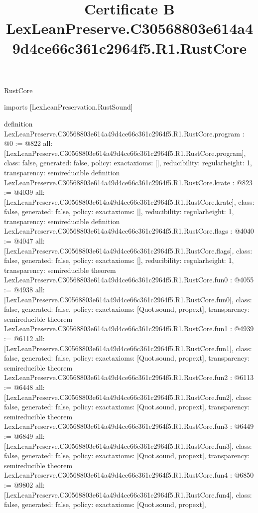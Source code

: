 \begin{lexlean}{RustCore}
\title{Certificate B LexLeanPreserve.C30568803e614a49d4ce66c361c2964f5.R1.RustCore}
\begin{coremodule}
imports [LexLeanPreservation.RustSound]

definition LexLeanPreserve.C30568803e614a49d4ce66c361c2964f5.R1.RustCore.program : @0 := @822 {
  all: [LexLeanPreserve.C30568803e614a49d4ce66c361c2964f5.R1.RustCore.program],
  class: false,
  generated: false,
  policy: exact{axioms: []},
  reducibility: regular{height: 1},
  transparency: semireducible
}
definition LexLeanPreserve.C30568803e614a49d4ce66c361c2964f5.R1.RustCore.krate : @823 := @4039 {
  all: [LexLeanPreserve.C30568803e614a49d4ce66c361c2964f5.R1.RustCore.krate],
  class: false,
  generated: false,
  policy: exact{axioms: []},
  reducibility: regular{height: 1},
  transparency: semireducible
}
definition LexLeanPreserve.C30568803e614a49d4ce66c361c2964f5.R1.RustCore.flags : @4040 := @4047 {
  all: [LexLeanPreserve.C30568803e614a49d4ce66c361c2964f5.R1.RustCore.flags],
  class: false,
  generated: false,
  policy: exact{axioms: []},
  reducibility: regular{height: 1},
  transparency: semireducible
}
theorem LexLeanPreserve.C30568803e614a49d4ce66c361c2964f5.R1.RustCore.fun0 : @4055 := @4938 {
  all: [LexLeanPreserve.C30568803e614a49d4ce66c361c2964f5.R1.RustCore.fun0],
  class: false,
  generated: false,
  policy: exact{axioms: [Quot.sound, propext]},
  transparency: semireducible
}
theorem LexLeanPreserve.C30568803e614a49d4ce66c361c2964f5.R1.RustCore.fun1 : @4939 := @6112 {
  all: [LexLeanPreserve.C30568803e614a49d4ce66c361c2964f5.R1.RustCore.fun1],
  class: false,
  generated: false,
  policy: exact{axioms: [Quot.sound, propext]},
  transparency: semireducible
}
theorem LexLeanPreserve.C30568803e614a49d4ce66c361c2964f5.R1.RustCore.fun2 : @6113 := @6448 {
  all: [LexLeanPreserve.C30568803e614a49d4ce66c361c2964f5.R1.RustCore.fun2],
  class: false,
  generated: false,
  policy: exact{axioms: [Quot.sound, propext]},
  transparency: semireducible
}
theorem LexLeanPreserve.C30568803e614a49d4ce66c361c2964f5.R1.RustCore.fun3 : @6449 := @6849 {
  all: [LexLeanPreserve.C30568803e614a49d4ce66c361c2964f5.R1.RustCore.fun3],
  class: false,
  generated: false,
  policy: exact{axioms: [Quot.sound, propext]},
  transparency: semireducible
}
theorem LexLeanPreserve.C30568803e614a49d4ce66c361c2964f5.R1.RustCore.fun4 : @6850 := @9802 {
  all: [LexLeanPreserve.C30568803e614a49d4ce66c361c2964f5.R1.RustCore.fun4],
  class: false,
  generated: false,
  policy: exact{axioms: [Quot.sound, propext]},
}
\end{coremodule}
\end{lexlean}
